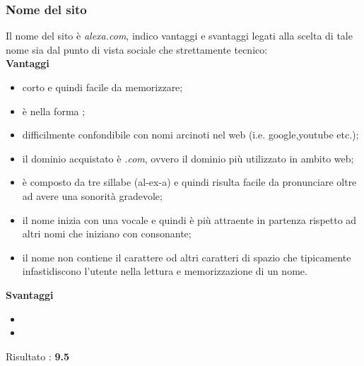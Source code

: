 \subsubsection{Nome del sito}
Il nome del sito è \textit{alexa.com}, indico vantaggi e svantaggi legati alla scelta di tale nome sia dal punto di vista sociale che strettamente tecnico: \\
\textbf{Vantaggi}
\begin{itemize}
	\item corto e quindi facile da memorizzare;
	\item è nella forma ;
	\item difficilmente confondibile con nomi arcinoti nel web (i.e. google,youtube etc.);
	\item il dominio acquistato è \textit{.com}, ovvero il dominio più utilizzato in ambito web;
	\item è composto da tre sillabe (al-ex-a) e quindi risulta facile da pronunciare
	oltre ad avere una sonorità gradevole;
	\item il nome inizia con una vocale e quindi è più attraente in partenza rispetto
	ad altri nomi che iniziano con consonante;
	\item il nome non contiene il carattere \quotes{-} od altri caratteri di spazio 
	che tipicamente infastidiscono l'utente nella lettura e memorizzazione di un nome.
\end{itemize}
\textbf{Svantaggi}
\begin{itemize}
	\item 
	\item 
\end{itemize}
Risultato : \textbf{9.5}